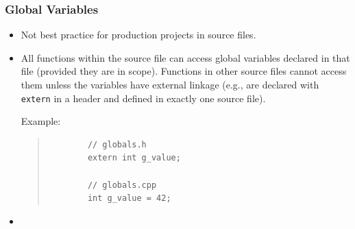 \documentclass[10pt]{article}
\begin{document}
\newpage
\subsubsection{Global Variables}
\begin{itemize}
	\item Not best practice for production projects in source files.
\item All functions within the source file can access global variables declared in that file (provided they are in scope). Functions in other source files cannot access them unless the variables have external linkage (e.g., are declared with \verb|extern| in a header and defined in exactly one source file).

	Example:
	\begin{quote}
		\begin{verbatim}
		// globals.h
		extern int g_value;

		// globals.cpp
		int g_value = 42;
		\end{verbatim}
	\end{quote}

\item {}
\end{itemize}

\newpage 
\end{document}
